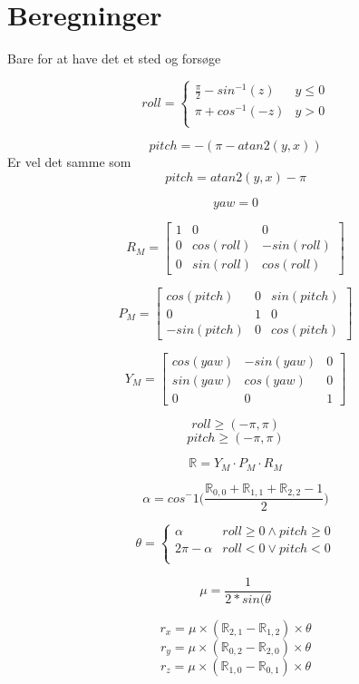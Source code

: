\section{Beregninger} 
Bare for at have det et sted og forsøge 

\[ roll = \begin{cases} 
      \frac{\pi}{2}-sin^{-1}(z) & y\leq 0 \\
      \pi +cos^{-1}(-z) & y > 0 \\
   \end{cases}
\]



$$ pitch = -(\pi -atan2(y,x)) $$ Er vel det samme som   $$ pitch = atan2(y,x) - \pi $$


\[yaw = 0\] 

\[R_M = \begin{bmatrix}
    1 & 0 & 0 \\
    0 & cos(roll) & -sin(roll) \\
    0 & sin(roll) & cos(roll)
\end{bmatrix}\] 


\[P_M = \begin{bmatrix}
    cos(pitch) & 0 & sin(pitch) \\
    0 & 1 & 0 \\
    -sin(pitch) & 0 & cos(pitch)
\end{bmatrix}\] 


\[Y_M = \begin{bmatrix}
    cos(yaw) & -sin(yaw) & 0 \\
    sin(yaw) & cos(yaw) & 0 \\
    0 & 0 & 1
\end{bmatrix}\] 

\[roll \geq (-\pi,\pi) \]
\[pitch \geq (-\pi,\pi) \]


\[\mathbb{R} = Y_M \cdot P_M \cdot R_M \]

\[\alpha = cos^-1\bigg(\frac{\mathbb{R}_{0,0}+\mathbb{R}_{1,1}+\mathbb{R}_{2,2}-1}{2}\bigg)\] 



\[ \theta = \begin{cases} 
      \alpha &  roll\geq 0 \land pitch \geq 0  \\
      2\pi-\alpha  &  roll < 0 \lor pitch < 0 \\
   \end{cases}
\]


\[\mu = \frac{1}{2*sin(\theta}\]



\[r_x =\mu \times(\mathbb{R}_{2,1}-\mathbb{R}_{1,2}) \times\theta \]
\[r_y =\mu \times(\mathbb{R}_{0,2}-\mathbb{R}_{2,0}) \times\theta \]
\[r_z =\mu \times(\mathbb{R}_{1,0}-\mathbb{R}_{0,1}) \times\theta \]



